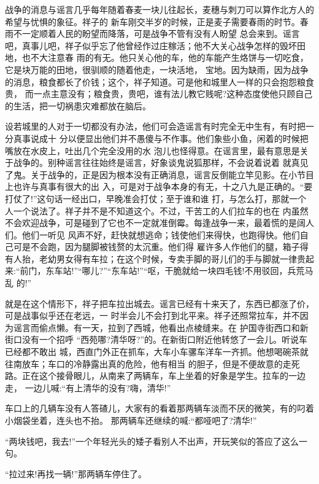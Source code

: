 \documentclass[11pt,a4paper,onecolumn]{article}
\begin{document}
战争的消息与谣言几乎每年随着春麦一块儿往起长，麦穗与刺刀可以算作北方人的希望与忧惧的象征。祥子的
新车刚交半岁的时候，正是麦子需要春雨的时节。春雨不一定顺着人民的盼望而降落，可是战争不管有没有人盼望
总会来到。谣言吧，真事儿吧，祥子似乎忘了他曾经作过庄稼活；他不大关心战争怎样的毁坏田地，也不大注意春
雨的有无。他只关心他的车，他的车能产生烙饼与一切吃食，它是块万能的田地，很驯顺的随着他走，一块活地，
宝地。因为缺雨，因为战争的消息，粮食都长了价钱；这个，祥子知道。可是他和城里人一样的只会抱怨粮食贵，
而一点主意没有；粮食贵，贵吧，谁有法儿教它贱呢?这种态度使他只顾自己的生活，把一切祸患灾难都放在脑后。

设若城里的人对于一切都没有办法，他们可会造谣言\myrule 有时完全无中生有，有时把一分真事说成十
分\myrule 以便显出他们并不愚傻与不作事。他们象些小鱼，闲着的时候把嘴放在水皮上，吐出几个完全没用的水
泡儿也怪得意。在谣言里，最有意思是关于战争的。别种谣言往往始终是谣言，好象谈鬼说狐那样，不会说着说着
就真见了鬼。关于战争的，正是因为根本没有正确消息，谣言反倒能立竿见影。在小节目上也许与真事有很大的出
入，可是对于战争本身的有无，十之八九是正确的。``要打仗了!''这句话一经出口，早晚准会打仗；至于谁和谁
打，与怎么打，那就一个人一个说法了。祥子并不是不知道这个。不过，干苦工的人们\myrule 拉车的也在
内\myrule 虽然不会欢迎战争，可是碰到了它也不一定就准倒霉。每逢战争一来，最着慌的是阔人们。他们一听见
风声不好，赶快就想逃命；钱使他们来得快，也跑得快。他们自己可是不会跑，因为腿脚被钱赘的太沉重。他们得
雇许多人作他们的腿，箱子得有人抬，老幼男女得有车拉；在这个时候，专卖手脚的哥儿们的手与脚就一律贵起
来:``前门，东车站!''``哪儿?''``东\myrule 车\myrule 站!''``呕，干脆就给一块四毛钱!不用驳回，兵荒马乱
的!''

就是在这个情形下，祥子把车拉出城去。谣言已经有十来天了，东西已都涨了价，可是战事似乎还在老远，一
时半会儿不会打到北平来。祥子还照常拉车，并不因为谣言而偷点懒。有一天，拉到了西城，他看出点棱缝来。在
护国寺街西口和新街口没有一个招呼 ``西苑哪?清华呀?''的。在新街口附近他转悠了一会儿。听说车已经都不敢出
城，西直门外正在抓车，大车小车骡车洋车一齐抓。他想喝碗茶就往南放车；车口的冷静露出真的危险，他有相当
的胆子，但是不便故意的走死路。正在这个接骨眼儿，从南来了两辆车，车上坐着的好象是学生。拉车的一边走，
一边儿喊:``有上清华的没有?嗨，清华!''

车口上的几辆车没有人答碴儿，大家有的看着那两辆车淡而不厌的微笑，有的叼着小烟袋坐着，连头也不抬。
那两辆车还继续的喊:``都哑吧了?清华!''

``两块钱吧，我去!''一个年轻光头的矮子看别人不出声，开玩笑似的答应了这么一句。

``拉过来!再找一辆!''那两辆车停住了。
\end{document}
